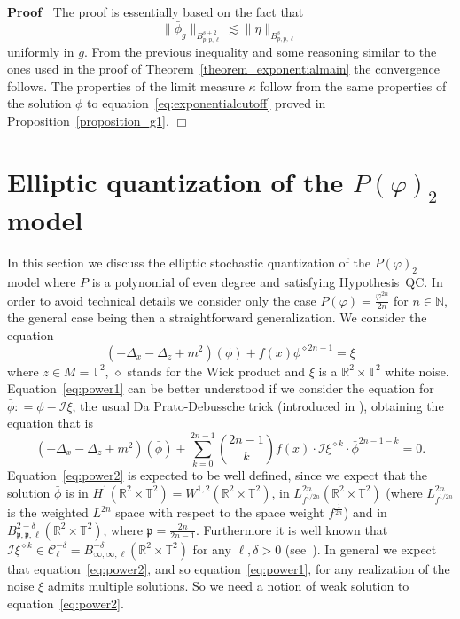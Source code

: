 \documentclass[a4paper,10pt]{article}
\newenvironment{proof}{\noindent\textbf{Proof\ }}{\hspace*{\fill}$\Box$\medskip}
\begin{document}
\begin{proof}
  The proof is essentially based on the fact that
  \[ \| \bar{\phi}_g \|_{B^{s + 2}_{p, p, \ell}} \lesssim \| \eta \|_{B^s_{p,
     p, \ell}} \]
  uniformly in $g$. From the previous inequality and some reasoning similar to
  the ones used in the proof of Theorem~\ref{theorem_exponentialmain} the
  convergence follows. The properties of the limit measure $\kappa$ follow
  from the same properties of the solution $\phi$ to
  equation~{\eqref{eq:exponentialcutoff}} proved in
  Proposition~\ref{proposition_g1}.
\end{proof}

\section{Elliptic quantization of the $P (\varphi)_2$
model}\label{section_power}

In this section we discuss the elliptic stochastic quantization of the $P
(\varphi)_2$ model where $P$ is a polynomial of even degree and satisfying
Hypothesis~QC. In order to avoid technical details we consider only the case
$P (\varphi) = \frac{\varphi^{2 n}}{2 n}$ for $n \in \mathbb{N}$, the general
case being then a straightforward generalization. We consider the equation
\begin{equation}
  (- \Delta_x - \Delta_z + m^2) (\phi) + f (x) \phi^{\diamond 2 n - 1} = \xi
  \label{eq:power1}
\end{equation}
where $z \in M =\mathbb{T}^2$, $\diamond$ stands for the Wick product and
$\xi$ is a $\mathbb{R}^2 \times \mathbb{T}^2$ white noise.
Equation~{\eqref{eq:power1}} can be better understood if we consider the
equation for $\bar{\phi} : = \phi - \mathcal{I} \xi$, the usual Da
Prato-Debussche trick (introduced in {\cite{da_prato_strong_2003}}), obtaining
the equation that is
\begin{equation}
  (- \Delta_x - \Delta_z + m^2) (\bar{\phi}) + \sum_{k = 0}^{2 n - 1} \binom{2
  n - 1}{k} f (x) \cdot \mathcal{I} \xi^{\diamond k} \cdot \bar{\phi}^{2 n - 1
  - k} = 0. \label{eq:power2}
\end{equation}
Equation~{\eqref{eq:power2}} is expected to be well defined, since we expect
that the solution $\bar{\phi}$ is in $H^1 (\mathbb{R}^2 \times \mathbb{T}^2) =
W^{1, 2} (\mathbb{R}^2 \times \mathbb{T}^2)$, in $L^{2 n}_{f^{1 / 2 n}}
(\mathbb{R}^2 \times \mathbb{T}^2)$ (where $L^{2 n}_{f^{1 / 2 n}}$ is the
weighted $L^{2 n}$ space with respect to the space weight $f^{\frac{1}{2 n}}$)
and in $B^{2 - \delta}_{\mathfrak{p}, \mathfrak{p}, \ell} (\mathbb{R}^2 \times
\mathbb{T}^2)$, where $\mathfrak{p =} \frac{2 n}{2 n - 1}$. Furthermore it is
well known that $\mathcal{I} \xi^{\diamond k} \in \mathcal{C}^{-
\delta}_{\ell} = B^{- \delta}_{\infty, \infty, \ell} (\mathbb{R}^2 \times
\mathbb{T}^2)$ for any $\ell, \delta > 0$ (see~{\cite{GH18}}). In general we
expect that equation~{\eqref{eq:power2}}, and so equation~{\eqref{eq:power1}},
for any realization of the noise $\xi$ admits multiple solutions. So we need a
notion of weak solution to equation~{\eqref{eq:power2}}.
\end{document}
